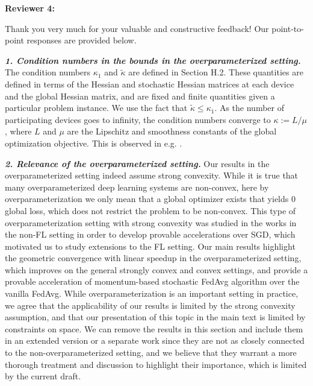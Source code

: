 \documentclass{article}
\begin{document}
{\color{blue}\textbf{Reviewer 4:}} 

Thank you very much for your valuable and constructive feedback! Our point-to-point responses are provided below.

\textbf{\textit{1. Condition numbers in the bounds in the overparameterized setting.}}
The condition numbers $\kappa_1$ and $\tilde{\kappa}$ are defined in Section H.2. These quantities are defined in terms of the Hessian and stochastic Hessian matrices at each device and the global Hessian matrix, and are fixed and finite quantities given a particular problem instance. We use the fact that $\tilde{\kappa}\leq \kappa_1$. As the number of participating devices goes to infinity, the condition numbers converge to $\kappa:=L/\mu$, where $L$ and $\mu$ are the Lipschitz and smoothness constants of the global optimization objective. This is observed in e.g. \cite{liu2018accelerating}.

\textbf{\textit{2. Relevance of the overparameterized setting.}}
Our results in the overparameterized setting indeed assume strong convexity. While it is true that many overparameterized deep learning systems are non-convex, here by overparameterization we only mean that a global optimizer exists that yields 0 global loss, which does not restrict the problem to be non-convex. This type of overparameterization setting with strong convexity was studied in the works \cite{jain2017accelerating,liu2018accelerating,ma2017power} in the non-FL setting in order to develop provable accelerations over SGD, which motivated us to study extensions to the FL setting. Our main results highlight the geometric convergence with linear speedup in the overparameterized setting, which improves on the general strongly convex and convex settings, and provide a provable acceleration of momentum-based stochastic FedAvg algorithm over the vanilla FedAvg. While overparameterization is an important setting in practice, we agree that the applicability of our results is limited by the strong convexity assumption, and that our presentation of this topic in the main text is limited by constraints on space. We can remove the results in this section and include them in an extended version or a separate work since they are not as closely connected to the non-overparameterized setting, and we believe that they warrant a more thorough treatment and discussion to highlight their importance, which is limited by the current draft.

\begin{comment}
since it serves as "bonus" results on top of non-overparameterized settings.
\end{comment}
\end{document}

